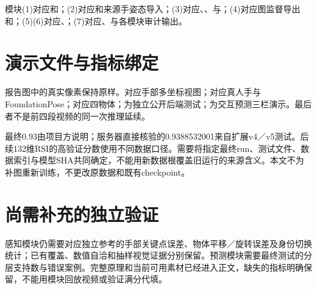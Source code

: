 模块(1)对应和；(2)对应和来源手姿态导入；(3)对应、、与；(4)对应图监督导出和；(5)(6)对应、；(7)对应、与各模块审计输出。

\section{演示文件与指标绑定}
\label{sec:assets}
报告图中的真实像素保持原样。对应手部多坐标视图；对应真人手与FoundationPose；对应四物体；为独立公开后端测试；为交互预测三栏演示。最后者不是前四段视频的同一次推理延续。

最终0.93由项目方说明；服务器直接核验的0.9388532001来自扩展v4／v5测试。后续132维RSI的高验证分数使用不同数据口径。需要将指定最终run、测试文件、数据索引与模型SHA共同确定，不能用新数据根覆盖旧运行的来源含义。本文不为补图重新训练，不更改原数据和既有checkpoint。

\section{尚需补充的独立验证}
感知模块仍需要对应独立参考的手部关键点误差、物体平移／旋转误差及身份切换统计；已有覆盖、数值自洽和抽样视觉证据分别保留。预测模块需要最终测试的分层支持数与错误案例。完整原理和当前可用素材已经进入正文，缺失的指标明确保留，不能用模块回放视频或验证满分代填。

